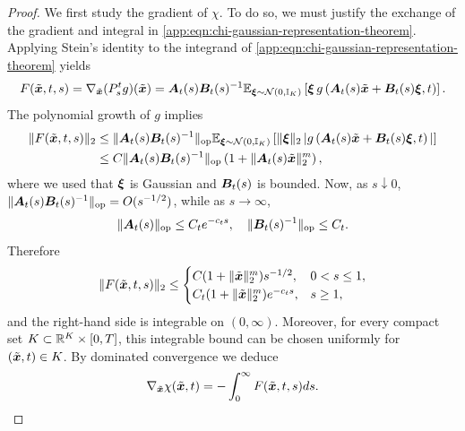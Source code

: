 \begin{proof}
We first study the gradient of $\chi$.
To do so, we must justify the exchange of the gradient and integral in \cref{app:eqn:chi-gaussian-representation-theorem}. Applying Stein's identity to the integrand of \cref{app:eqn:chi-gaussian-representation-theorem} yields 
\begin{equation*}
    F(\tilde{\boldsymbol{x}},t,s) = \nabla_{\tilde{\boldsymbol{x}}}(P_s^t g)(\tilde{\boldsymbol{x}}) = \boldsymbol{A}_t(s)\boldsymbol{B}_t(s)^{-1} \mathbb{E}_{\boldsymbol{\xi} \sim \mathcal{N}(0,\mathbb{I}_K)} \left[ \boldsymbol{\xi} \, g\left(\boldsymbol{A}_t(s)\tilde{\boldsymbol{x}}+\boldsymbol{B}_t(s)\boldsymbol{\xi},t\right) \right].
\end{equation*}
The polynomial growth of $g$ implies
\begin{equation*}
\begin{aligned}
    \|F(\tilde{\boldsymbol{x}},t,s)\|_2 &\leq \|\boldsymbol{A}_t(s)\boldsymbol{B}_t(s)^{-1}\|_{\mathrm{op}} \mathbb{E}_{\boldsymbol{\xi} \sim \mathcal{N}(0,\mathbb{I}_K)} \left[ \|\boldsymbol{\xi}\|_2\,|g\left(\boldsymbol{A}_t(s)\tilde{\boldsymbol{x}}+\boldsymbol{B}_t(s)\boldsymbol{\xi},t\right)| \right] \\
    &\leq C\|\boldsymbol{A}_t(s)\boldsymbol{B}_t(s)^{-1}\|_{\mathrm{op}} \left(1+\|\boldsymbol{A}_t(s)\tilde{\boldsymbol{x}}\|_2^m\right),
\end{aligned}
\end{equation*}
where we used that $\boldsymbol{\xi}$ is Gaussian and $\boldsymbol{B}_t(s)$ is bounded.
Now, as $s\downarrow 0$, $\|\boldsymbol{A}_t(s)\boldsymbol{B}_t(s)^{-1}\|_{\mathrm{op}} = O(s^{-1/2})$,
while as $s\to\infty$,
\begin{equation*}
    \|\boldsymbol{A}_t(s)\|_{\mathrm{op}} \le C_t e^{-c_t s}, \quad \|\boldsymbol{B}_t(s)^{-1}\|_{\mathrm{op}} \le C_t.
\end{equation*}
Therefore
\begin{equation*}
    \|F(\tilde{\boldsymbol{x}},t,s)\|_2 \leq \begin{cases} C(1+\|\tilde{\boldsymbol{x}}\|_2^m)s^{-1/2}, & 0 < s \leq 1,\\ C_t(1+\|\tilde{\boldsymbol{x}}\|_2^m)e^{-c_t s}, & s\geq 1, \end{cases}
\end{equation*}
and the right-hand side is integrable on $(0,\infty)$. Moreover, for every compact set $K \subset \mathbb{R}^K \times [0,T]$, this integrable bound can be chosen uniformly for $(\tilde{\boldsymbol{x}},t)\in K$. By dominated convergence we deduce 
\begin{equation*}
    \nabla_{\tilde{\boldsymbol{x}}} \chi(\tilde{\boldsymbol{x}},t) = -\int_0^\infty F(\tilde{\boldsymbol{x}}, t, s) ds.
\end{equation*}


\end{proof}
